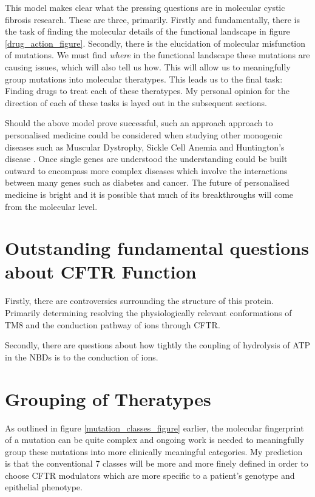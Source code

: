 This model makes clear what the pressing questions are in molecular cystic fibrosis research. These are three, primarily. Firstly and fundamentally, there is the task of finding the molecular details of the functional landscape in figure \ref{drug_action_figure}. Secondly, there is the elucidation of molecular misfunction of mutations. We must find \textit {where} in the functional landscape these mutations are causing issues, which will also tell us how. This will allow us to meaningfully group mutations into molecular theratypes. This leads us to the final task: Finding drugs to treat each of these theratypes. My personal opinion for the direction of each of these tasks is layed out in the subsequent sections.

Should the above model prove successful, such an approach approach to personalised medicine could  be considered when studying other monogenic diseases such as Muscular  Dystrophy, Sickle Cell Anemia and Huntington's disease \cite{}. Once single genes are understood the understanding could be built outward to encompass more complex diseases which involve the interactions between many genes such as diabetes and cancer. The future of personalised medicine is bright and it is possible that much of its breakthroughs will come from the molecular level.

\section{Outstanding fundamental questions about CFTR Function}
Firstly, there are controversies surrounding the structure of this protein. Primarily determining resolving the physiologically relevant conformations of TM8 and the conduction pathway of ions through CFTR.

Secondly, there are questions about how tightly the coupling of hydrolysis of ATP in the NBDs is to the conduction of ions.

\section{Grouping of Theratypes}
As outlined in figure \ref{mutation_classes_figure} earlier, the molecular fingerprint of a mutation can be quite complex and ongoing work is needed to meaningfully group these mutations into more clinically meaningful categories. My prediction is that the conventional 7 classes will be more and more finely defined in order to choose CFTR modulators which are more specific to a patient's genotype and epithelial phenotype. 

